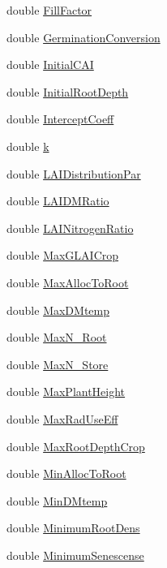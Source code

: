 \begin{DoxyCompactItemize}
\item 
double \hyperlink{classcrop_ab94a62632b347617f4f62b317a16ff73}{FillFactor}
\item 
double \hyperlink{classcrop_a134737bfb7ce5b5c558f15a19232181f}{GerminationConversion}
\item 
double \hyperlink{classcrop_af3aac84af1f2d62509c26dfe15d1756c}{InitialCAI}
\item 
double \hyperlink{classcrop_ac51148719f4b421963566a281b04c0cf}{InitialRootDepth}
\item 
double \hyperlink{classcrop_a068c7be7b71c0b4581ec57ffd204766b}{InterceptCoeff}
\item 
double \hyperlink{classcrop_a9836313fa9dae417e0d3a41850209e37}{k}
\item 
double \hyperlink{classcrop_a94bdf58b80c10956d690e55f9dfc3bf8}{LAIDistributionPar}
\item 
double \hyperlink{classcrop_ac84c4bfe32722d43f1edf0f3954bf6d9}{LAIDMRatio}
\item 
double \hyperlink{classcrop_aa53e9f0b5c21a1dafb1d78291820350d}{LAINitrogenRatio}
\item 
double \hyperlink{classcrop_a79905dd2d78bdaafd9569f9ecdd43665}{MaxGLAICrop}
\item 
double \hyperlink{classcrop_a8ee0da1040a104bfc08b4618d3574db1}{MaxAllocToRoot}
\item 
double \hyperlink{classcrop_a6c3d05934ce21df6acb4161c3baab56e}{MaxDMtemp}
\item 
double \hyperlink{classcrop_a62361ade607f9cc57e226c1134ad0eb2}{MaxN\_\-Root}
\item 
double \hyperlink{classcrop_a9f5ab366fce6f1259588cf5087cdb4c2}{MaxN\_\-Store}
\item 
double \hyperlink{classcrop_a211a8242464133985cb2f26964b0f782}{MaxPlantHeight}
\item 
double \hyperlink{classcrop_ace1e4d77fd9e80f3cd5c301927e03630}{MaxRadUseEff}
\item 
double \hyperlink{classcrop_aa37b1e6e7ca46537edb64086518d5088}{MaxRootDepthCrop}
\item 
double \hyperlink{classcrop_a366215bb50374cc375870081f55df157}{MinAllocToRoot}
\item 
double \hyperlink{classcrop_aea1414f901f3fc6d6ad5e8d2936ea409}{MinDMtemp}
\item 
double \hyperlink{classcrop_a94dedacaf228ed611dd4a9c43fcf1140}{MinimumRootDens}
\item 
double \hyperlink{classcrop_a99a529deb646061aa62fcb9953844de2}{MinimumSenescense}

\end{DoxyCompactItemize}
